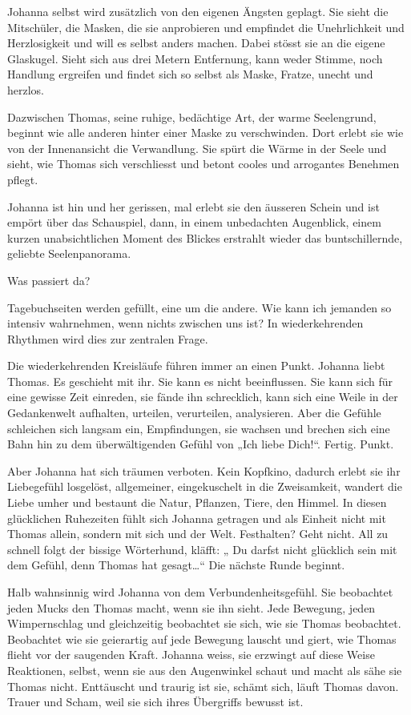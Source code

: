 \documentclass[10pt,titlepage,a5paper]{book}
\begin{document}
Johanna selbst wird zusätzlich von den eigenen Ängsten geplagt. Sie sieht die Mitschüler, die Masken, die sie anprobieren und empfindet die Unehrlichkeit und Herzlosigkeit und will es selbst anders machen. Dabei stösst sie an die eigene Glaskugel. Sieht sich aus drei Metern Entfernung, kann weder Stimme, noch Handlung ergreifen und findet sich so selbst als Maske, Fratze, unecht und herzlos.

Dazwischen Thomas, seine ruhige, bedächtige Art, der warme Seelengrund, beginnt wie alle anderen hinter einer Maske zu ver\-schwin\-den. Dort erlebt sie wie von der Innenansicht die Verwandlung. Sie spürt die Wärme in der Seele und sieht, wie Thomas sich verschliesst und betont cooles und arrogantes Benehmen pflegt. 

Johanna ist hin und her gerissen, mal erlebt sie den äusseren Schein und ist empört über das Schauspiel, dann, in einem unbedachten Augenblick, einem kurzen unabsichtlichen Moment des Blickes erstrahlt wieder das buntschillernde, geliebte Seelenpanorama. 

Was passiert da?

Tagebuchseiten werden gefüllt, eine um die andere. Wie kann ich jemanden so intensiv wahrnehmen, wenn nichts zwischen uns ist? In wiederkehrenden Rhythmen wird dies zur zentralen Frage. 

Die wiederkehrenden Kreisläufe führen immer an einen Punkt. Johanna liebt Thomas. Es geschieht mit ihr. Sie kann es nicht beeinflussen. Sie kann sich für eine gewisse Zeit einreden, sie fände ihn schrecklich, kann sich eine Weile in der Gedankenwelt  aufhalten, urteilen, verurteilen, analysieren. Aber die Gefühle schleichen sich langsam ein, Empfindungen, sie wachsen und brechen sich  eine Bahn hin zu dem überwältigenden Gefühl von „Ich liebe Dich!“.  Fertig. Punkt.

Aber Johanna hat sich träumen verboten. Kein Kopfkino, dadurch erlebt sie ihr Liebegefühl losgelöst, allgemeiner, eingekuschelt in die Zweisamkeit, wandert die Liebe umher und bestaunt die Natur, Pflanzen, Tiere, den Himmel. In diesen glücklichen Ruhezeiten fühlt sich Johanna getragen und als Einheit nicht mit Thomas allein, sondern mit sich und der Welt. Festhalten? Geht nicht. All zu schnell folgt der bissige Wörterhund, kläfft: „ Du darfst nicht glücklich sein mit dem Gefühl, denn Thomas hat gesagt\dots “ Die nächste Runde beginnt.

Halb wahnsinnig wird Johanna von dem Verbundenheitsgefühl. Sie beobachtet jeden Mucks den Thomas macht, wenn sie ihn sieht. Jede Bewegung, jeden Wimpernschlag und gleichzeitig beobachtet sie sich, wie sie Thomas beobachtet. Beobachtet wie sie geierartig auf jede Bewegung lauscht und giert, wie Thomas flieht vor der saugenden Kraft. Johanna weiss, sie erzwingt auf diese Weise Reaktionen, selbst, wenn sie aus den Augenwinkel schaut und macht als sähe sie Thomas nicht. Enttäuscht und traurig ist sie, schämt sich, läuft Thomas davon. Trauer und Scham, weil sie sich ihres Übergriffs bewusst ist. 
\end{document}
